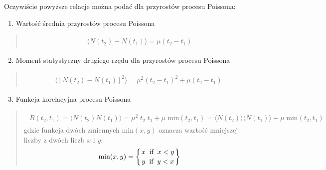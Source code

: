 \documentclass[a4paper,12pt,polish]{sphinxmanual}
\begin{document}
Oczywiście powyższe relacje można podać dla przyrostów procesu Poissona:
\begin{enumerate}
\item {} 
Wartość średnia przyrostów procesu Poissona

\end{enumerate}
\begin{quote}
\label{ch3/chIII021:equation-eqn31}\begin{gather}
\begin{split}\langle N(t_2) - N(t_1)\rangle = \mu (t_2-t_1)\end{split}\label{ch3/chIII021-eqn31}
\end{gather}\end{quote}
\begin{enumerate}
\setcounter{enumi}{1}
\item {} 
Moment statystyczny drugiego rzędu dla przyrostów procesu Poissona

\end{enumerate}
\begin{quote}
\label{ch3/chIII021:equation-eqn32}\begin{gather}
\begin{split}\langle [N(t_2) - N(t_1)]^2 \rangle = \mu^2 (t_2-t_1)^2 + \mu (t_2-t_1) \;\end{split}\label{ch3/chIII021-eqn32}
\end{gather}\end{quote}
\begin{enumerate}
\setcounter{enumi}{2}
\item {} 
Funkcja korelacyjna procesu Poissona

\end{enumerate}
\begin{quote}
\label{ch3/chIII021:equation-eqn33}\begin{gather}
\begin{split}R(t_2, t_1) = \langle N(t_2) N(t_1)\rangle = \mu^2 \;t_2 \;t_1 + \mu \; \mbox{min}(t_2, t_1) = \langle N(t_2)\rangle\langle N(t_1)\rangle+ \mu \; \mbox{min}(t_2, t_1)\end{split}\label{ch3/chIII021-eqn33}
\end{gather}
gdzie funkcja dwóch zmiennych $\mbox{min}(x, y)$ oznacza wartość mniejszej liczby z dwóch liczb $x$ i $y$:
\label{ch3/chIII021:equation-eqn34}\begin{gather}
\begin{split}\mbox{min} (x, y) = \left\{ {{x \; \; \mbox{if}\; \; x < y} \atop {y \; \; \mbox{if} \; \; y<x}}\right\}\end{split}\label{ch3/chIII021-eqn34}
\end{gather}\end{quote}
\end{document}
